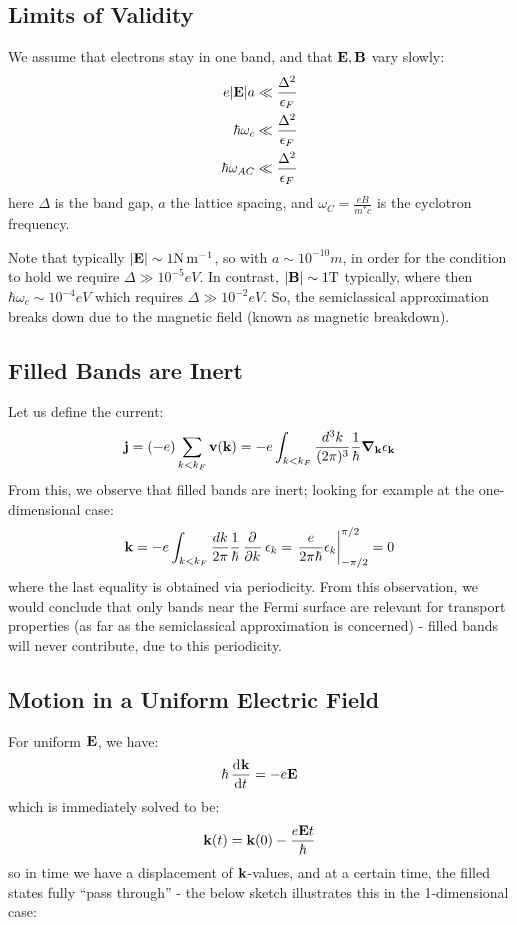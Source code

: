 \subsection{Limits of Validity}
We assume that electrons stay in one band, and that $\v{E}, \v{B}$ vary slowly:
\begin{equation}
    \begin{split}
        e \abs{\v{E}} a &\ll \frac{\Delta^2}{\e_F}
        \\ \hbar \omega_c &\ll \frac{\Delta^2}{\e_F}
        \\ \hbar \omega_{AC} &\ll \frac{\Delta^2}{\e_F}
    \end{split}
\end{equation}
here $\Delta$ is the band gap, $a$ the lattice spacing, and $\omega_C = \frac{eB}{m^* c}$ is the cyclotron frequency.

Note that typically $\abs{\v{E}} \sim 1\si{N.m^{-1}}$, so with $a \sim 10^{-10}\si{m}$, in order for the condition to hold we require $\Delta \gg 10^{-5}\si{eV}$. In contrast, $\abs{\v{B}} \sim 1\si{T}$ typically, where then $\hbar \omega_c \sim 10^{-4}\si{eV}$ which requires $\Delta \gg 10^{-2}\si{eV}$. So, the semiclassical approximation breaks down due to the magnetic field (known as magnetic breakdown).

\subsection{Filled Bands are Inert}
Let us define the current:
\begin{equation}
    \v{j} = (-e)\sum_{k < k_F} \v{v}(\v{k}) = -e \int_{k < k_F} \frac{d^3k}{(2\pi)^3}\frac{1}{\hbar}\nabla_{\v{k}}\e_{\v{k}}
\end{equation}
From this, we observe that filled bands are inert; looking for example at the one-dimensional case:
\begin{equation}
    \v{k} = -e\int_{k < k_F}\frac{dk}{2\pi}\frac{1}{\hbar}\dpd{}{k}\e_k = \left.\frac{e}{2\pi \hbar} \e_k \right|_{-\pi/2}^{\pi/2} = 0
\end{equation}
where the last equality is obtained via periodicity. From this observation, we would conclude that only bands near the Fermi surface are relevant for transport properties (as far as the semiclassical approximation is concerned) - filled bands will never contribute, due to this periodicity.

\subsection{Motion in a Uniform Electric Field}
For uniform $\v{E}$, we have:
\begin{equation}
    \hbar \dod{\v{k}}{t} = -e\v{E}
\end{equation}
which is immediately solved to be:
\begin{equation}
    \v{k}(t) = \v{k}(0) - \frac{e\v{E}t}{\hbar}
\end{equation}
so in time we have a displacement of $\v{k}$-values, and at a certain time, the filled states fully ``pass through'' - the below sketch illustrates this in the 1-dimensional case:

